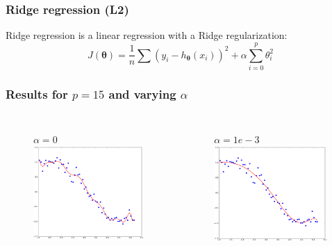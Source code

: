 \documentclass[handout, 10pt]{beamer}
\begin{document}
\begin{frame}
\frametitle{Ridge regression (L2)}
\begin{block}{}
Ridge regression is a linear regression with a Ridge regularization:
$$
J(\bm{\theta}) = \frac{1}{n} \sum (y_i - h_{\bm{\theta}}(x_i))^2 + \alpha \sum_{i=0}^p \theta_i^2
$$
\end{block}
\end{frame}

\begin{frame}
\frametitle{Results for $p=15$ and varying $\alpha$}
\begin{columns}
\vspace{-2em}
\begin{figure}
$\alpha=0$
\includegraphics[width=0.99\textwidth]{./ridge_alpha0.png}
\end{figure}
\vspace{-2em}
\begin{figure}
$\alpha=1e-3$
\includegraphics[width=0.99\textwidth]{./ridge_alpha1e-3.png}

\end{figure}
\end{columns}
\end{frame}
\end{document}
